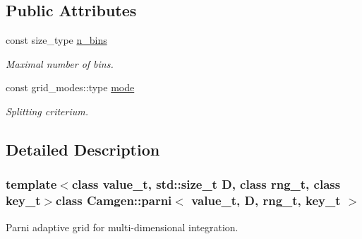 \subsection*{Public Attributes}
\begin{DoxyCompactItemize}
\item 
\hypertarget{a00384_a3c0800e4e999c70ab1fad21f341def19}{const size\-\_\-type \hyperlink{a00384_a3c0800e4e999c70ab1fad21f341def19}{n\-\_\-bins}}\label{a00384_a3c0800e4e999c70ab1fad21f341def19}

\begin{DoxyCompactList}\small\item\em Maximal number of bins. \end{DoxyCompactList}\item 
\hypertarget{a00384_ad0f2114550fa55bb7ba525ffcb41f688}{const grid\-\_\-modes\-::type \hyperlink{a00384_ad0f2114550fa55bb7ba525ffcb41f688}{mode}}\label{a00384_ad0f2114550fa55bb7ba525ffcb41f688}

\begin{DoxyCompactList}\small\item\em Splitting criterium. \end{DoxyCompactList}\end{DoxyCompactItemize}


\subsection{Detailed Description}
\subsubsection*{template$<$class value\-\_\-t, std\-::size\-\_\-t D, class rng\-\_\-t, class key\-\_\-t$>$class Camgen\-::parni$<$ value\-\_\-t, D, rng\-\_\-t, key\-\_\-t $>$}

Parni adaptive grid for multi-\/dimensional integration. 

